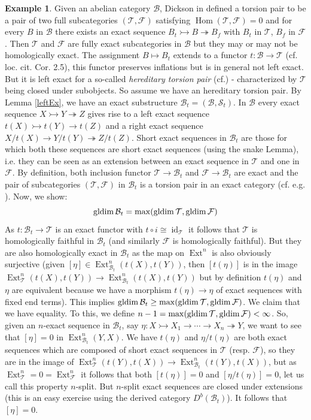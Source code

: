\documentclass[11pt,a4paper]{amsart}
\theoremstyle{plain}
\theoremstyle{definition}
\newtheorem{exa}[thm]{Example}
\DeclareMathOperator{\Hom}{Hom}
\DeclareMathOperator{\Ext}{Ext}
\DeclareMathOperator{\id}{id}
\DeclareMathOperator{\gldim}{gldim}
\newcommand{\defl}{\twoheadrightarrow}
\newcommand{\infl}{\rightarrowtail}
\newcommand{\mcB}{\mathcal{B}}
\newcommand{\mcF}{\mathcal{F}}
\newcommand{\mcS}{\mathcal{S}}
\newcommand{\mcT}{\mathcal{T}}
\begin{document}
\begin{exa} \label{tpExa} 
Given an abelian category $\mcB$, Dickson in \cite{Dic} defined a torsion pair to be a pair of two full subcategories $(\mcT, \mcF)$ satisfying $\Hom (\mcT, \mcF)=0$ and for every $B$ in $\mcB$ there exists an exact sequence $B_t\infl B \defl B_f$ with $B_t$ in $\mcT$, $B_f$ in $\mcF$. Then $\mcT$ and $\mcF$ are fully exact subcategories in $\mcB$ but they may or may not be homologically exact. 
The assignment $B \mapsto B_t$ extends to a functor $t \colon \mcB \to \mcT$ (cf. loc. cit. Cor. 2.5), this functor preserves inflations but is in general not left exact. But it is left exact for a so-called \emph{hereditary torsion pair} (cf.\cite[ Ch. VI, Prop. 1.7]{St}) - characterized by $\mcT$ being closed under subobjects. So assume we have an hereditary torsion pair.    
By Lemma \ref{leftEx}, we have an exact substructure $\mcB_t=(\mcB, \mcS_t)$. In $\mcB$ every exact sequence $X\infl Y \defl Z$ gives rise to a left exact sequence $t(X) \infl t(Y) \to t(Z)$ and a right exact sequence $X/t(X) \to Y/t(Y) \defl Z/t(Z)$. Short exact sequences in $\mcB_t$ are those for which both these sequences are short exact sequences (using the snake Lemma), i.e. they can be seen as an extension between an exact sequence in $\mcT$ and one in $\mcF$. By definition, both inclusion functor $\mcT \to \mcB_t$ and $\mcF \to \mcB_t$ are exact and the pair of subcategories $(\mcT, \mcF)$ in $\mcB_t$ is a torsion pair in an exact category (cf. e.g. \cite[Ex. 3.5]{AET}). Now, we show: 
\[
\gldim \mcB_t =  {\rm max} (\gldim \mcT, \gldim \mcF )
\]
As $t\colon \mcB_t \to \mcT$ is an exact functor with $t\circ i\cong \id_{\mcT}$ it follows that $\mcT$ is homologically faithful in $\mcB_t$ (and similarly $\mcF$ is homologically faithful). But they are also homologically exact in $\mcB_t$ as the map on $\Ext^n$ is also obviously surjective (given $[\eta] \in \Ext^n_{\mcB_t} (t(X), t(Y))$, then $[t(\eta)]$ is in the image $\Ext^n_{\mcT} (t(X), t(Y))\to \Ext^n_{\mcB_t} (t(X), t(Y))$ but by definition $t(\eta)$ and $\eta$ are equivalent because we have a morphism $t(\eta) \to \eta$ of exact sequences with fixed end terms). 
This implies $\gldim \mcB_t\geq {\rm max} (\gldim \mcT, \gldim \mcF )$. We claim that we have equality. To this, we define 
$n-1={\rm max} (\gldim \mcT, \gldim \mcF )<\infty $. So, given an $n$-exact sequence in $\mcB_t$, say $\eta \colon X \infl X_1 \to \cdots \to X_n \defl Y$, we want to see that $[\eta]=0$ in $\Ext^n_{\mcB_t}(Y,X)$. We have $t(\eta)$ and $\eta/t(\eta)$ are both exact sequences which are composed of short exact sequences in $\mcT$ (resp. $\mcF$), so they are in the image of $\Ext^n_{\mcT} (t(Y),t(X))\to \Ext^n_{\mcB_t} (t(Y),t(X))$, but as $\Ext^n_{\mcT}=0=\Ext^n_{\mcF}$ it follows that both $[t(\eta)]=0$ and $[\eta/t(\eta)]=0$, let us call this property $n$-split. But $n$-split exact sequences are closed under extensions (this is an easy exercise using the derived category $D^b(\mcB_t)$). It follows that $[\eta]=0$. \\

\end{exa}
\end{document}
